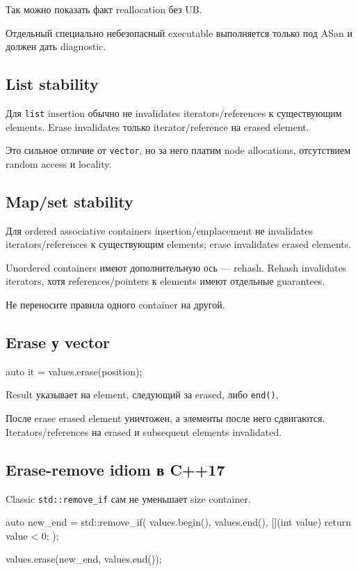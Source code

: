 Так можно показать факт reallocation без UB.

Отдельный специально небезопасный executable выполняется только под ASan и
должен дать diagnostic.

\subsection{List stability}

Для \texttt{list} insertion обычно не invalidates iterators/references к
существующим elements. Erase invalidates только iterator/reference на erased
element.

Это сильное отличие от \texttt{vector}, но за него платим node allocations,
отсутствием random access и locality.

\subsection{Map/set stability}

Для ordered associative containers insertion/emplacement не invalidates
iterators/references к существующим elements; erase invalidates erased
elements.

Unordered containers имеют дополнительную ось --- rehash. Rehash invalidates
iterators, хотя references/pointers к elements имеют отдельные guarantees.

Не переносите правила одного container на другой.

\subsection{Erase у vector}

\begin{cppcode}
auto it = values.erase(position);
\end{cppcode}

Result указывает на element, следующий за erased, либо \texttt{end()}.

После erase erased element уничтожен, а элементы после него сдвигаются.
Iterators/references на erased и subsequent elements invalidated.

\subsection{Erase-remove idiom в C++17}

Classic \texttt{std::remove\_if} сам не уменьшает size container.

\begin{cppcode}
auto new_end = std::remove_if(
    values.begin(),
    values.end(),
    [](int value) {
        return value < 0;
    }
);

values.erase(new_end, values.end());
\end{cppcode}

